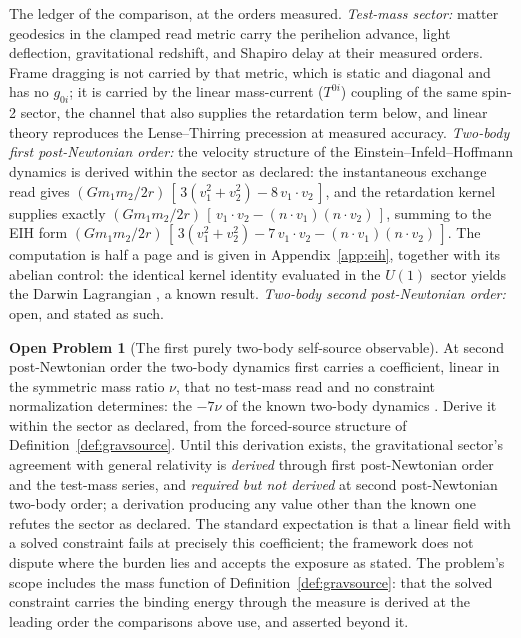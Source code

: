 \documentclass[11pt]{article}
\theoremstyle{definition}
\newtheorem{openproblem}[theorem]{Open Problem}
\theoremstyle{remark}
\begin{document}
The ledger of the comparison, at the orders measured.  \emph{Test-mass
sector:} matter geodesics in the clamped read metric carry the
perihelion advance, light deflection, gravitational redshift, and
Shapiro delay at their measured orders.  Frame dragging is not carried
by that metric, which is static and diagonal and has no $g_{0i}$; it is
carried by the linear mass-current ($T^{0i}$) coupling of the same
spin-2 sector, the channel that also supplies the retardation term
below, and linear theory reproduces the Lense--Thirring precession at
measured accuracy.  \emph{Two-body
first post-Newtonian order:} the velocity structure of the
Einstein--Infeld--Hoffmann dynamics \cite{eih} is derived within the
sector as declared: the instantaneous exchange read gives
$(Gm_1m_2/2r)\,[\,3(v_1^2{+}v_2^2) - 8\,v_1\!\cdot\!v_2\,]$, and the
retardation kernel supplies exactly
$(Gm_1m_2/2r)\,[\,v_1\!\cdot\!v_2 - (n\!\cdot\!v_1)(n\!\cdot\!v_2)\,]$,
summing to the EIH form
$(Gm_1m_2/2r)\,[\,3(v_1^2{+}v_2^2) - 7\,v_1\!\cdot\!v_2 -
(n\!\cdot\!v_1)(n\!\cdot\!v_2)\,]$.  The computation is half a page and
is given in Appendix~\ref{app:eih}, together with its abelian control:
the identical kernel identity evaluated in the $U(1)$ sector yields the
Darwin Lagrangian \cite{landau}, a known result.  \emph{Two-body second
post-Newtonian order:} open, and stated as such.

\begin{openproblem}[The first purely two-body self-source observable]
\label{op:2pn}
At second post-Newtonian order the two-body dynamics first carries a
coefficient, linear in the symmetric mass ratio $\nu$, that no
test-mass read and no constraint normalization determines: the $-7\nu$ of the known two-body dynamics \cite{damourschafer}.  Derive it
within the sector as declared, from the forced-source structure of
Definition~\ref{def:gravsource}.  Until this derivation exists, the
gravitational sector's agreement with general relativity is
\emph{derived} through first post-Newtonian order and the test-mass
series, and \emph{required but not derived} at second post-Newtonian
two-body order; a derivation producing any value other than the known
one refutes the sector as declared.  The standard expectation is that a
linear field with a solved constraint fails at precisely this
coefficient; the framework does not dispute where the burden lies and
accepts the exposure as stated.  The problem's scope includes the mass
function of Definition~\ref{def:gravsource}: that the solved
constraint carries the binding energy through the measure is derived at
the leading order the comparisons above use, and asserted beyond it.
\end{openproblem}
\end{document}
